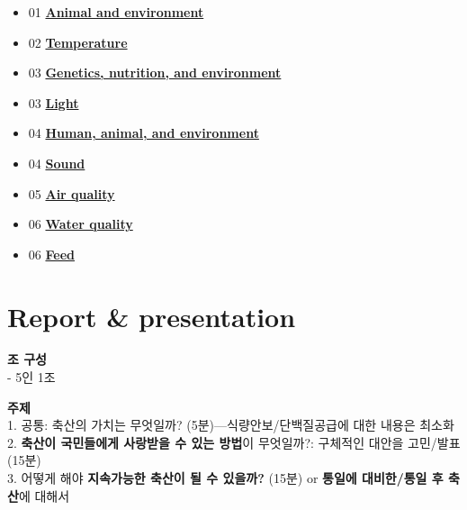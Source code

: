 \documentclass[]{book}
\providecommand{\tightlist}{%
  \setlength{\itemsep}{0pt}\setlength{\parskip}{0pt}}
\begin{document}
\begin{itemize}
\tightlist
\item
  01
  \textbf{\href{https://youngjunna.github.io/aes/02-AnimalandEnvironment}{Animal
  and environment}}\\
\item
  02
  \textbf{\href{https://youngjunna.github.io/aes/03-Temperature}{Temperature}}\\
\item
  03
  \textbf{\href{https://github.com/YoungjunNa/2019-animal-nutrition-and-the-environment/raw/master/03\%E1\%84\%8C\%E1\%85\%AE\%E1\%84\%8E\%E1\%85\%A1-\%E1\%84\%83\%E1\%85\%A9\%E1\%86\%BC\%E1\%84\%86\%E1\%85\%AE\%E1\%86\%AF\%E1\%84\%92\%E1\%85\%AA\%E1\%86\%AB\%E1\%84\%80\%E1\%85\%A7\%E1\%86\%BC\%E1\%84\%92\%E1\%85\%A1\%E1\%86\%A8.pdf}{Genetics,
  nutrition, and environment}}\\
\item
  03 \textbf{\href{https://youngjunna.github.io/aes/04-Light}{Light}}\\
\item
  04
  \textbf{\href{https://github.com/YoungjunNa/aes/raw/master/04-aes.pdf}{Human,
  animal, and environment}}\\
\item
  04 \textbf{\href{https://youngjunna.github.io/aes/05-Sound}{Sound}}\\
\item
  05 \textbf{\href{https://youngjunna.github.io/aes/06-AirQuality}{Air
  quality}}\\
\item
  06
  \textbf{\href{https://youngjunna.github.io/aes/07-WaterQuality}{Water
  quality}}\\
\item
  06
  \textbf{\href{https://youngjunna.github.io/aes/08-ByProducts}{Feed}}
\end{itemize}

\section{Report \& presentation}\label{report-presentation}

\textbf{조 구성}\\
- 5인 1조

\textbf{주제}\\
1. 공통: 축산의 가치는 무엇일까? (5분)---식량안보/단백질공급에 대한
내용은 최소화\\
2. \textbf{축산이 국민들에게 사랑받을 수 있는 방법}이 무엇일까?:
구체적인 대안을 고민/발표(15분)\\
3. 어떻게 해야 \textbf{지속가능한 축산이 될 수 있을까?} (15분) or
\textbf{통일에 대비한/통일 후 축산}에 대해서
\end{document}
